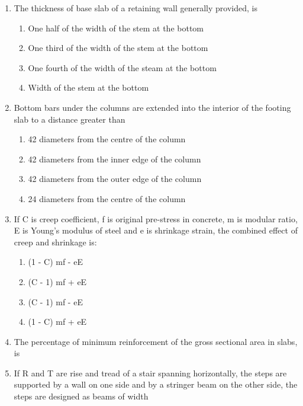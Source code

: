 \documentclass[11pt,a4paper]{article}
\begin{document}
\begin{enumerate}
\item{The thickness of base slab of a retaining wall generally provided, is}
\begin{enumerate}[label=\Alph*.]
\item{One half of the width of the stem at the bottom}
\item{One third of the width of the stem at the bottom}
\item{One fourth of the width of the steam at the bottom}
\item{Width of the stem at the bottom}
\end{enumerate}
\item{Bottom bars under the columns are extended into the interior of the footing slab to a distance greater than}
\begin{enumerate}[label=\Alph*.]
\item{42 diameters from the centre of the column}
\item{42 diameters from the inner edge of the column}
\item{42 diameters from the outer edge of the column}
\item{24 diameters from the centre of the column}
\end{enumerate}
\item{If C is creep coefficient, f is original pre-stress in concrete, m is modular ratio, E is Young's modulus of steel and e is shrinkage strain, the combined effect of creep and shrinkage is:}
\begin{enumerate}[label=\Alph*.]
\item{(1 - C) mf - eE}
\item{(C - 1) mf + eE}
\item{(C - 1) mf - eE}
\item{(1 - C) mf + eE}
\end{enumerate}
\item{The percentage of minimum reinforcement of the gross sectional area in slabs, is}
\\
\item{If R and T are rise and tread of a stair spanning horizontally, the steps are supported by a wall on one side and by a stringer beam on the other side, the steps are designed as beams of width}

\end{enumerate}
\end{document}
